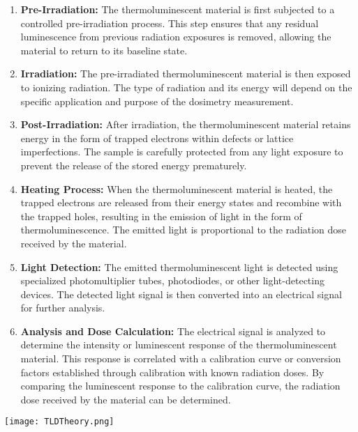 \documentclass[../introduction.tex]{subfiles}
\begin{document}
        \begin{enumerate}
            \item \textbf{Pre-Irradiation: } The thermoluminescent material is first subjected to a controlled 
            pre-irradiation process. This step ensures that any residual luminescence from previous radiation 
            exposures is removed, allowing the material to return to its baseline state.

            \item \textbf{Irradiation: } The pre-irradiated thermoluminescent material is then exposed to ionizing 
            radiation. The type of radiation and its energy will depend on the specific application and purpose of 
            the dosimetry measurement.

            \item \textbf{Post-Irradiation: } After irradiation, the thermoluminescent material retains energy in the 
            form of trapped electrons within defects or lattice imperfections. The sample is carefully protected from 
            any light exposure to prevent the release of the stored energy prematurely.

            \item \textbf{Heating Process: } When the thermoluminescent material is heated, the trapped electrons are 
            released from their energy states and recombine with the trapped holes, resulting in the emission of light 
            in the form of thermoluminescence. The emitted light is proportional to the radiation dose received by the 
            material.

            \item \textbf{Light Detection: } The emitted thermoluminescent light is detected using specialized 
            photomultiplier tubes, photodiodes, or other light-detecting devices. The detected light signal is then 
            converted into an electrical signal for further analysis.

            \item \textbf{Analysis and Dose Calculation: } The electrical signal is analyzed to determine the intensity 
            or luminescent response of the thermoluminescent material. This response is correlated with a calibration 
            curve or conversion factors established through calibration with known radiation doses. By comparing the 
            luminescent response to the calibration curve, the radiation dose received by the material can be determined.

        \end{enumerate}
        \begin{Figure}
            \centering
            \texttt{[image: TLDTheory.png]}
            \label{fig:TLDTheory}
        \end{Figure}
        
\end{document}
